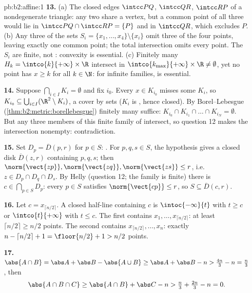 \begin{solution}{pb:b2:affine:1}
\textbf{13.} (a) The closed edges $\intcc PQ$, $\intcc QR$,
$\intcc RP$ of a nondegenerate triangle: any two share a
vertex, but a common point of all three would lie in $\intcc
PQ \cap \intcc RP = \{P\}$ and in $\intcc QR$, which excludes
$P$. (b) Any three of the sets $S_i = \{x_1, \dots, x_4\}
\setminus \{x_i\}$ omit three of the four points, leaving
exactly one common point; the total intersection omits every
point. The $S_i$ are finite, not : convexity is
essential. (c) Finitely many $H_k = \intco{k}{+\infty} \times
\R$ intersect in $\intco{k_{\max}}{+\infty} \times \R \neq
\emptyset$, yet no point has $x \geq k$ for all $k \in \N$:
for infinite families,  is essential.

\textbf{14.} Suppose $\bigcap_{i \in I}K_i = \emptyset$ and
fix $i_0$. Every $x \in K_{i_0}$ misses some $K_i$, so
$K_{i_0} \subseteq \bigcup_{i \in I}(\R^2 \setminus K_i)$, a
cover by  sets ($K_i$ is , hence closed). By
Borel--Lebesgue (\cref{thm:b2:metric:borellebesgue}) finitely
many suffice: $K_{i_0} \cap K_{i_1} \cap \dots \cap K_{i_N} =
\emptyset$. But any three members of this finite family of
 intersect, so question 12 makes the intersection
nonempty: contradiction.

\textbf{15.} Set $D_p = \overline D(p, r)$ for $p \in S$:
 . For $p, q, s \in S$, the hypothesis
gives a closed disk $\overline D(z, r)$ containing $p, q, s$;
then $\norm{\vect{zp}}, \norm{\vect{zq}}, \norm{\vect{zs}}
\leq r$, i.e.\ $z \in D_p \cap D_q \cap D_s$. By Helly
(question 12; the family is finite) there is $c \in
\bigcap_{p \in S}D_p$: every $p \in S$ satisfies
$\norm{\vect{cp}} \leq r$, so $S \subseteq \overline D(c,
r)$.

\textbf{16.} Let $c = x_{\lceil n/2\rceil}$. A closed
half-line containing $c$ is $\intoc{-\infty}{t}$ with $t \geq
c$ or $\intco{t}{+\infty}$ with $t \leq c$. The first
contains $x_1, \dots, x_{\lceil n/2\rceil}$: at least
$\lceil n/2\rceil \geq n/2$ points. The second contains
$x_{\lceil n/2\rceil}, \dots, x_n$: exactly $n - \lceil
n/2\rceil + 1 = \floor{n/2} + 1 > n/2$ points.

\textbf{17.} $\abs{A \cap B} = \abs A + \abs B - \abs{A \cup
B} \geq \abs A + \abs B - n > \tfrac{4n}3 - n = \tfrac n3$,
then
\[
\abs{A \cap B \cap C} \geq \abs{A \cap B} + \abs C - n >
\tfrac n3 + \tfrac{2n}3 - n = 0 .
\]


\end{solution}
